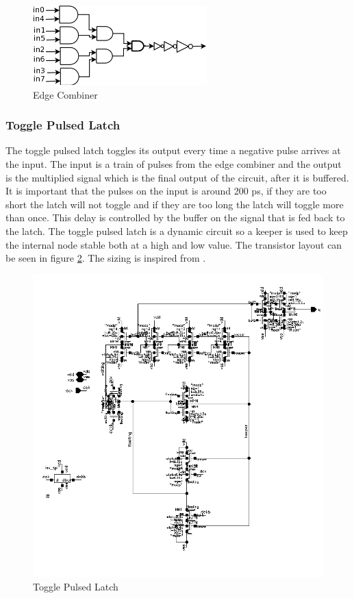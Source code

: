 \documentclass[a4paper,12pt]{article} \usepackage{graphicx}
\begin{document}
\begin{figure}[p]
        \centering
        \includegraphics[width=0.6\textwidth]{../Bilder/edge_combiner_trans.png}
        \caption{Edge Combiner}
        \label{fig:edge_comb}
\end{figure}

\subsubsection{Toggle Pulsed Latch}
The toggle pulsed latch toggles its output every time a negative pulse arrives
at the input. The input is a train of pulses from the edge combiner and the
output is the multiplied signal which is the final output of the circuit, after
it is buffered. It is important that the pulses on the input is around 200 ps,
if they are too short the latch will not toggle and if they are too long the
latch will toggle more than once. This delay is controlled by the buffer on the
signal that is fed back to the latch. The toggle pulsed latch is a dynamic
circuit so a keeper is used to keep the internal node stable both at a high and
low value.
The transistor layout can be seen in figure \ref{fig:tpl}. The
sizing is inspired from \cite{dll_report}. 
\begin{figure}[p]
        \centering
        \includegraphics[width=\textwidth]{../Bilder/tpl_trans.png}
        \caption{Toggle Pulsed Latch}
        \label{fig:tpl}
\end{figure}
\end{document}
